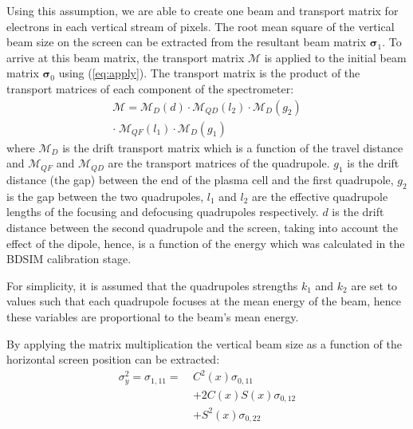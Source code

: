 Using this assumption, we are able to create one beam and transport matrix for
electrons in each vertical stream of pixels. The root mean square of the
vertical beam size on the screen can be extracted from the resultant beam matrix
\(\bm{\sigma}_1\). To arrive at this beam matrix, the transport matrix
\(\mathcal{M}\) is applied to the initial beam matrix \(\bm{\sigma}_0\) using
(\ref{eq:apply}). The transport matrix is the product of the transport matrices
of each component of the spectrometer:
\begin{equation}
	\begin{split}
		\mathcal{M} = \mathcal{M}_D(d) \cdot \mathcal{M}_{QD}(l_2) \cdot
		\mathcal{M}_D(g_2) \\
		\cdot\;\mathcal{M}_{QF}(l_1) \cdot \mathcal{M}_D(g_1)
	\end{split}
\end{equation}
where \(\mathcal{M}_D\) is the drift transport matrix which is a function of the
travel distance and \(\mathcal{M}_{QF}\) and \(\mathcal{M}_{QD}\) are the
transport matrices of the quadrupole. \(g_1\) is the drift distance (the gap)
between the end of the plasma cell and the first quadrupole, \(g_2\) is the gap
between the two quadrupoles, \(l_1\) and \(l_2\) are the effective quadrupole
lengths of the focusing and defocusing quadrupoles respectively. \(d\) is the
drift distance between the second quadrupole and the screen, taking into account
the effect of the dipole, hence, is a function of the energy which was
calculated in the BDSIM calibration stage.

For simplicity, it is assumed that the quadrupoles strengths \(k_1\) and \(k_2\)
are set to values such that each quadrupole focuses at the mean energy of the
beam, hence these variables are proportional to the beam's mean energy.



By applying the matrix multiplication the vertical beam size as a
function of the horizontal screen position can be extracted:
\begin{equation}
	\begin{split}
		\sigma_y^2 = \sigma_{1,11} =\: & C^2(x)\sigma_{0,11} \\
									&+ 2C(x)S(x)\sigma_{0,12} \\
									&+ S^2(x)\sigma_{0,22}
	\end{split}
\end{equation}

